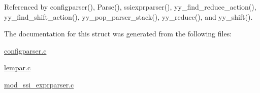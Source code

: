 Referenced by configparser(), Parse(), ssiexprparser(), yy\-\_\-find\-\_\-reduce\-\_\-action(), yy\-\_\-find\-\_\-shift\-\_\-action(), yy\-\_\-pop\-\_\-parser\-\_\-stack(), yy\-\_\-reduce(), and yy\-\_\-shift().



The documentation for this struct was generated from the following files\-:\begin{DoxyCompactItemize}
\item 
\hyperlink{configparser_8c}{configparser.\-c}\item 
\hyperlink{lempar_8c}{lempar.\-c}\item 
\hyperlink{mod__ssi__exprparser_8c}{mod\-\_\-ssi\-\_\-exprparser.\-c}\end{DoxyCompactItemize}

